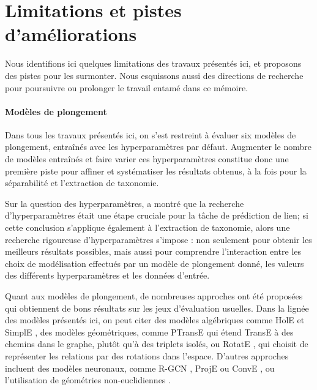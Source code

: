 \section{Limitations et pistes d'améliorations}

Nous identifions ici quelques limitations des travaux présentés ici, et proposons des pistes pour les surmonter. Nous esquissons aussi des directions de recherche pour poursuivre ou prolonger le travail entamé dans ce mémoire.


\paragraph{Modèles de plongement}

Dans tous les travaux présentés ici, on s'est restreint à évaluer six modèles de plongement, entraînés avec les hyperparamètres par défaut. Augmenter le nombre de modèles entraînés et faire varier ces hyperparamètres constitue donc une première piste pour affiner et systématiser les résultats obtenus, à la fois pour la séparabilité et l'extraction de taxonomie. 

Sur la question des hyperparamètres, \cite{kadlec2017knowledge} a montré que la recherche d'hyperparamètres était une étape cruciale pour la tâche de prédiction de lien; si cette conclusion s'applique également à l'extraction de taxonomie, alors une recherche rigoureuse d'hyperparamètres s'impose : non seulement pour obtenir les meilleurs résultats possibles, mais aussi pour comprendre l'interaction entre les choix de modélisation effectués par un modèle de plongement donné, les valeurs des différents hyperparamètres et les données d'entrée. 

Quant aux modèles de plongement, de nombreuses approches ont été proposées qui obtiennent de bons résultats sur les jeux d'évaluation usuelles. Dans la lignée des modèles présentés ici, on peut citer des modèles algébriques comme HolE \cite{hole2016} et SimplE \cite{simple2018}, des modèles géométriques, comme PTransE \cite{ptranse} qui étend TransE à des chemins dans le graphe, plutôt qu'à des triplets isolés, ou RotatE \cite{rotate2019}, qui choisit de représenter les relations par des rotations dans l'espace. D'autres approches incluent des modèles neuronaux, comme R-GCN \cite{rgcn2018}, ProjE \cite{proje2017} ou ConvE \cite{conve2018}, ou l'utilisation de géométries non-euclidiennes \cite{nickel2017poincare, nickel2018learning}.

